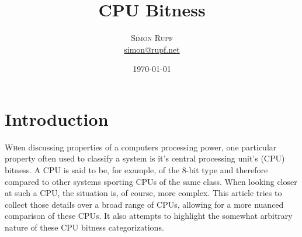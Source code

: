 \documentclass[twoside,twocolumn]{article}
\title{CPU Bitness} %
\author{%
\textsc{Simon Rupf} \\[1ex]
\normalsize \href{mailto:simon@rupf.net}{simon@rupf.net}
}
\date{\today} %
\begin{document}
\maketitle


\section{Introduction}

\lettrine[nindent=0em,lines=3]{W}hen discussing properties of a computers processing
power, one particular property often used to classify a system is it's central processing
unit's (CPU) bitness. A CPU is said to be, for example, of the 8-bit type and therefore
compared to other systems sporting CPUs of the same class. When looking closer at such a
CPU, the situation is, of course, more complex. This article tries to collect those
details over a broad range of CPUs, allowing for a more nuanced comparison of these CPUs.
It also attempts to highlight the somewhat arbitrary nature of these CPU bitness
categorizations.

\end{document}
